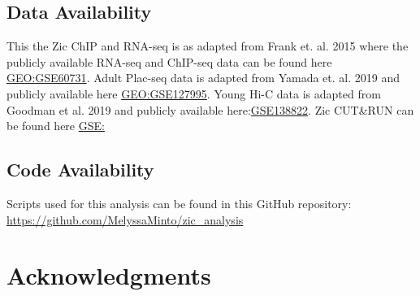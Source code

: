 \documentclass[fleqn,10pt]{wlscirep}
\begin{document}
\subsection*{Data Availability}
This the Zic ChIP and RNA-seq is as adapted from Frank et. al. 2015 \cite{Frank2015RegulationCerebellum} where the publicly available RNA-seq and ChIP-seq  data can be found here \href{https://www.ncbi.nlm.nih.gov/geo/query/acc.cgi?acc=GSE60731}{GEO:GSE60731}. Adult Plac-seq data is adapted from Yamada et. al. 2019 \cite{Yamada2019SensoryLearning} and publicly available here \href{https://www.ncbi.nlm.nih.gov/geo/query/acc.cgi?acc=GSE127995}{GEO:GSE127995}. Young Hi-C data is adapted from Goodman et al. 2019 \cite{Goodman2020TheBrain} and publicly available here:\href{https://www.ncbi.nlm.nih.gov/geo/query/acc.cgi?acc=GSE138822}{GSE138822}. Zic CUT\&RUN can be found here \href{}{GSE:}

\subsection*{Code Availability}
Scripts used for this analysis can be found in this GitHub repository: \href{https://github.com/MelyssaMinto/zic_analysis}{https://github.com/MelyssaMinto/zic_analysis}

\section*{Acknowledgments}

\clearpage

\clearpage


\beginsupplement
\end{document}
